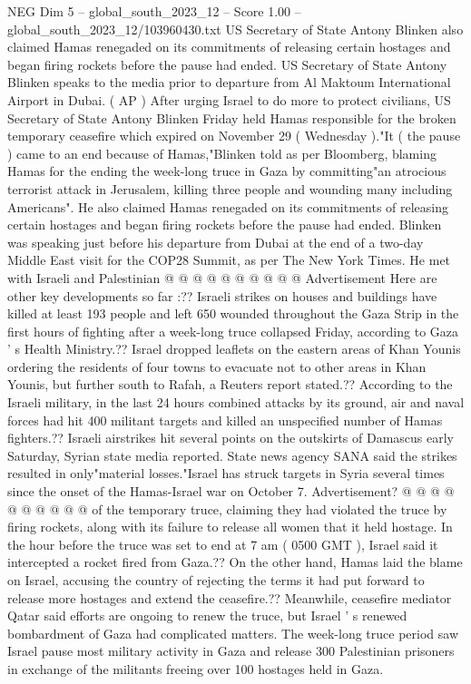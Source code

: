 \begin{textsample}{NEG Dim 5 – global\_south\_2023\_12 – Score 1.00 – global\_south\_2023\_12/103960430.txt}  \label{ex:f5_neg_354}
US Secretary of State Antony Blinken also claimed Hamas renegaded on its commitments of releasing certain hostages and began firing rockets before the pause had ended.
US Secretary of State Antony Blinken speaks to the media prior to departure from Al Maktoum International Airport in Dubai. ( AP ) After urging Israel to do more to protect civilians, US Secretary of State Antony Blinken Friday held Hamas responsible for the broken temporary ceasefire which expired on November 29 ( Wednesday )."It ( the pause ) came to an end because of Hamas,"Blinken told as per Bloomberg, blaming Hamas for the ending the week-long truce in Gaza by committing"an atrocious terrorist attack in Jerusalem, killing three people and wounding many including Americans".
He also claimed Hamas renegaded on its commitments of releasing certain hostages and began firing rockets before the pause had ended.
Blinken was speaking just before his departure from Dubai at the end of a two-day Middle East visit for the COP28 Summit, as per The New York Times.
He met with Israeli and Palestinian @ @ @ @ @ @ @ @ @ @ Advertisement Here are other key developments so far :??
Israeli strikes on houses and buildings have killed at least 193 people and left 650 wounded throughout the Gaza Strip in the first hours of fighting after a week-long truce collapsed Friday, according to Gaza ' s Health Ministry.??
Israel dropped leaflets on the eastern areas of Khan Younis ordering the residents of four towns to evacuate not to other areas in Khan Younis, but further south to Rafah, a Reuters report stated.??
According to the Israeli military, in the last 24 hours combined attacks by its ground, air and naval forces had hit 400 militant targets and killed an unspecified number of Hamas fighters.??
Israeli airstrikes hit several points on the outskirts of Damascus early Saturday, Syrian state media reported.
State news agency SANA said the strikes resulted in only"material losses."Israel has struck targets in Syria several times since the onset of the Hamas-Israel war on October 7.
Advertisement? @ @ @ @ @ @ @ @ @ @ of the temporary truce, claiming they had violated the truce by firing rockets, along with its failure to release all women that it held hostage.
In the hour before the truce was set to end at 7 am ( 0500 GMT ), Israel said it intercepted a rocket fired from Gaza.??
On the other hand, Hamas laid the blame on Israel, accusing the country of rejecting the terms it had put forward to release more hostages and extend the ceasefire.??
Meanwhile, ceasefire mediator Qatar said efforts are ongoing to renew the truce, but Israel ' s renewed bombardment of Gaza had complicated matters.
The week-long truce period saw Israel pause most military activity in Gaza and release 300 Palestinian prisoners in exchange of the militants freeing over 100 hostages held in Gaza.

\end{textsample}
